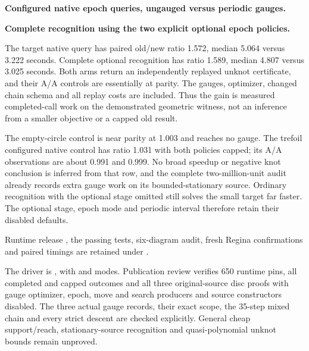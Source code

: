 \textbf{Configured native epoch queries, ungauged versus periodic gauges.}

\textbf{Complete recognition using the two explicit optional epoch policies.}


The target native query has paired old/new ratio 1.572, median 5.064 versus
3.222 seconds. Complete optional recognition has ratio 1.589, median 4.807
versus 3.025 seconds. Both arms return an independently replayed unknot
certificate, and their A/A controls are essentially at parity. The gauges,
optimizer, changed chain schema and all replay costs are included. Thus the
gain is measured completed-call work on the demonstrated geometric witness,
not an inference from a smaller objective or a capped old result.

The empty-circle control is near parity at 1.003 and reaches no gauge. The
trefoil configured native control has ratio 1.031 with both policies capped;
its A/A observations are about 0.991 and 0.999. No broad speedup or negative
knot conclusion is inferred from that row, and the complete two-million-unit
audit already records extra gauge work on its bounded-stationary source.
Ordinary recognition with the optional stage omitted still solves the small
target far faster. The optional stage, epoch mode and periodic interval
therefore retain their disabled defaults.

Runtime release , the passing tests, six-diagram audit,
fresh Regina confirmations and paired timings are retained under
.

The driver is
, with  and 
modes. Publication review verifies 650 runtime pins, all completed and capped
outcomes and all three original-source disc proofs with gauge optimizer,
epoch, move and search producers and source constructors disabled. The three actual gauge
records, their exact scope, the 35-step mixed chain and every strict descent
are checked explicitly. General cheap support/reach, stationary-source
recognition and quasi-polynomial unknot bounds remain unproved.
